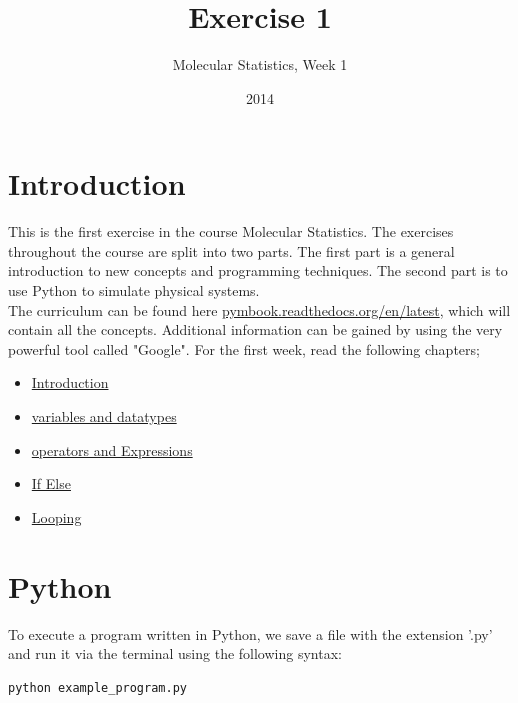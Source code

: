 \documentclass{article}
\title{Exercise 1}
\author{Molecular Statistics, Week 1}
\date{2014}
\begin{document}

\maketitle

\section{Introduction}

This is the first exercise in the course Molecular Statistics. The exercises
throughout the course are split into two parts. The first part is a general
introduction to new concepts and programming techniques. The second part is to use
Python to simulate physical systems.\\

The curriculum can be found here 
\href{http://pymbook.readthedocs.org/en/latest/}{pymbook.readthedocs.org/en/latest},
which will contain all the concepts.
Additional information can be gained by using the very powerful tool called "Google".
For the first week, read the following chapters;

\begin{itemize}
    \item \href{http://pymbook.readthedocs.org/en/latest/thebeginning.html}{Introduction}
    \item \href{http://pymbook.readthedocs.org/en/latest/variablesanddatatypes.html}{variables and datatypes}
    \item \href{http://pymbook.readthedocs.org/en/latest/operatorsexpressions.html}{operators and Expressions}
    \item \href{http://pymbook.readthedocs.org/en/latest/ifelse.html}{If Else}
    \item \href{http://pymbook.readthedocs.org/en/latest/looping.html}{Looping}
\end{itemize}


\section{Python}

To execute a program written in Python, we save a file with the extension
'.py' and run it via the terminal using the following syntax:

\begin{lstlisting}
python example_program.py
\end{lstlisting}
\end{document}
